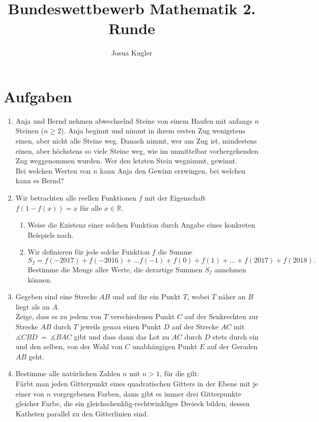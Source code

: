 \documentclass[12pt]{article}
\author{Josua Kugler}
\title{Bundeswettbewerb Mathematik 2. Runde}
\numberwithin{equation}{subsection}
\begin{document}
\maketitle

\section{Aufgaben}
\begin{enumerate}
	\item Anja und Bernd nehmen abwechselnd Steine von einem Haufen mit anfangs $n$ Steinen ($n\ge2$). Anja beginnt und nimmt in ihrem ersten Zug wenigstens einen, aber nicht alle Steine weg. Danach nimmt, wer am Zug ist, mindestens einen, aber höchstens so viele Steine weg, wie im unmittelbar vorhergehenden Zug weggenommen wurden. Wer den letzten Stein wegnimmt, gewinnt.\\
	Bei welchen Werten von $n$ kann Anja den Gewinn erzwingen, bei welchen kann es Bernd?
	\item Wir betrachten alle reellen Funktionen $f$ mit der Eigenschaft\\ $f(1-f(x))=x$ für alle $x\in\mathbb{R}$.
	\begin{enumerate}
		\item Weise die Existenz einer solchen Funktion durch Angabe eines konkreten Beispiels nach.
		\item Wir definieren für jede solche Funktion $f$ die Summe\\
		$S_f=f(-2017)+f(-2016)+...f(-1)+f(0)+f(1)+...+f(2017)+f(2018).$\\
		Bestimme die Menge aller Werte, die derartige Summen $S_f$ annehmen können.
	\end{enumerate}
	\item Gegeben sind eine Strecke $AB$ und auf ihr ein Punkt $T$, wobei $T$ näher an $B$ liegt als an $A$.\\
	Zeige, dass es zu jedem von $T$ verschiedenen Punkt $C$ auf der Senkrechten zur Strecke $AB$ durch $T$ jeweils genau einen Punkt $D$ auf der Strecke $AC$ mit $\measuredangle CBD\ = \ \measuredangle BAC$ gibt und dass dann das Lot zu $AC$ durch $D$ stets durch ein und den selben, von der Wahl von $C$ unabhängigen Punkt $E$ auf der Geraden $AB$ geht.
	\item Bestimme alle natürlichen Zahlen $n$ mit $n>1$, für die gilt:\\
	Färbt man jeden Gitterpunkt eines quadratischen Gitters in der Ebene mit je einer von $n$ vorgegebenen Farben, dann gibt es immer drei Gitterpunkte gleicher Farbe, die ein gleichschenklig-rechtwinkliges Dreieck bilden, dessen Katheten parallel zu den Gitterlinien sind.
\end{enumerate}
	\pagebreak
\end{document}
